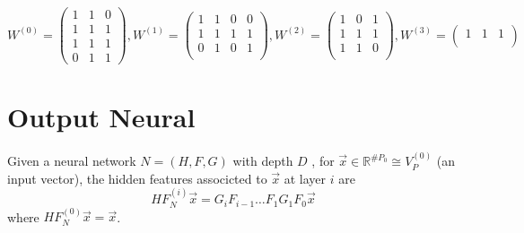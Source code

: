 \begin{enumerate}
$$            W^{(0)} = \begin{pmatrix}
                1 & 1 & 0\\
                1 & 1 & 1\\
                1 & 1 & 1\\
                0 & 1 & 1
            \end{pmatrix},
            W^{(1)} = \begin{pmatrix}
                1 & 1 & 0 & 0\\
                1 & 1 & 1 & 1\\
                0 & 1 & 0 & 1\\
            \end{pmatrix},
            W^{(2)} = \begin{pmatrix}
                1 & 0 & 1\\
                1 & 1 & 1\\
                1 & 1 & 0\\
            \end{pmatrix},
            W^{(3)} = \begin{pmatrix}
                1 & 1 & 1\\
            \end{pmatrix}
 $$
\end{enumerate}

\section{Output Neural}
\begin{definition}
  Given a neural network  $N=(H, F, G)$  with depth  $D$ , for  $\vec{x} \in \mathbb{R}^{\# P_{0}} \cong V_{P}^{(0)}$  (an input vector), the hidden features associcted to  $\vec{x}$  at layer  $i$  are
$$
H F_{N}^{(i)} \vec{x}=G_{i} F_{i-1} \ldots F_{1} G_{1} F_{0} \vec{x}
$$
where  $ H F_{N}^{(0)} \vec{x}=\vec{x}$.  
\end{definition}


